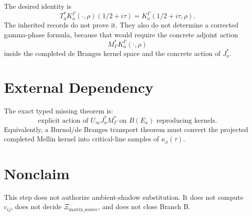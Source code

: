 \documentclass[11pt]{article}
\begin{document}
The desired identity is
\[
T_a^*K_a^\Gamma(\cdot,\rho)(1/2+i\tau)
=K_a^\Gamma(1/2+i\tau,\rho).
\]
The inherited records do not prove it.  They also do not determine a corrected
gamma-phase formula, because that would require the concrete adjoint action
\[
M_\Gamma^*K_a^\Gamma(\cdot,\rho)
\]
inside the completed de Branges kernel space and the concrete action of
\(J_a^*\).

\section*{External Dependency}

The exact typed missing theorem is:
\[
\boxed{\text{explicit action of }U_\infty J_a^*M_\Gamma^*
\text{ on }B(E_a)\text{ reproducing kernels}.}
\]
Equivalently, a Burnol/de Branges transport theorem must convert the projected
completed Mellin kernel into critical-line samples of \(\kappa_\rho(\tau)\).

\section*{Nonclaim}

This step does not authorize ambient-shadow substitution.  It does not compute
\(c_{ij}\), does not decide \(\Xi_{\mathrm{matrix\_source}}\), and does not
close Branch B.
\end{document}
